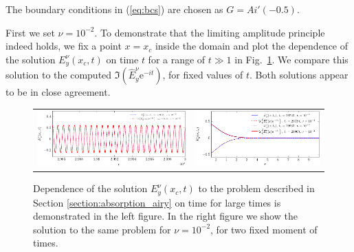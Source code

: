The boundary conditions in (\ref{eq:bcs}) are chosen as $G=Ai'(-0.5)$. 

First we set $\nu=10^{-2}$. To demonstrate that the limiting amplitude principle indeed holds, we fix a point $x=x_c$ 
inside the domain and plot the dependence of the solution $E_{y}^{\nu}(x_c,t)$ 
on time $t$ for a range of $t\gg 1$ in Fig.~\ref{fig:nu1e2_harmon}. We compare this solution to the computed $\Im\left(\hat{E}_y^{\nu}\mathrm{e}^{-it}\right)$, for
fixed values of $t$. Both solutions appear to be in close agreement. 

\begin{figure}[htb]
\begin{tabular}{cc}
\includegraphics[height=0.2\textwidth]{pics_time_domain/airy/figure_nu1e2-crop.pdf} & \includegraphics[height=0.2\textwidth]{pics_time_domain/airy/figure_nu1e2_2-crop.pdf}
\end{tabular}
\caption{Dependence of the solution $E_{y}^{\nu}(x_c,t)$ to the problem described in Section \ref{section:absorption_airy} on time for large times is demonstrated in the left figure.  
In the right figure we show the solution to the same problem for $\nu=10^{-2}$, for two fixed moment of times.}
 \label{fig:nu1e2_harmon}
\end{figure}


